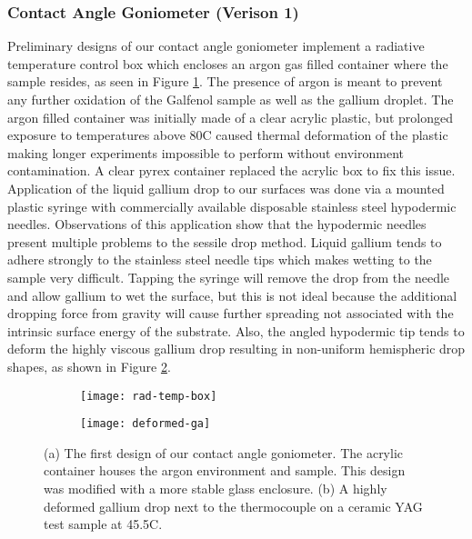 \subsubsection{Contact Angle Goniometer (Verison 1)}
Preliminary designs of our contact angle goniometer implement a radiative temperature control box which encloses an argon gas filled container where the sample resides, as seen in Figure \ref{fig:rad-temp-box}.  The presence of argon is meant to prevent any further oxidation of the Galfenol sample as well as the gallium droplet. The argon filled container was initially made of a clear acrylic plastic, but prolonged exposure to temperatures above 80\degree C caused thermal deformation of the plastic making longer experiments impossible to perform without environment contamination.  A clear pyrex container replaced the acrylic box to fix this issue.  Application of the liquid gallium drop to our surfaces was done via a mounted plastic syringe with commercially available disposable stainless steel hypodermic needles.  Observations of this application show that the hypodermic needles present multiple problems to the sessile drop method.  Liquid gallium tends to adhere strongly to the stainless steel needle tips which makes wetting to the sample very difficult.  Tapping the syringe will remove the drop from the needle and allow gallium to wet the surface, but this is not ideal because the additional dropping force from gravity will cause further spreading not associated with the intrinsic surface energy of the substrate.  Also, the angled hypodermic tip tends to deform the highly viscous gallium drop resulting in non-uniform hemispheric drop shapes, as shown in Figure \ref{fig:deformed-ga}.
\begin{figure}
	\centering
	\begin{subfigure}[c]{0.45\textwidth}
		\texttt{[image: rad-temp-box]}
		\subcaption{~}
		\label{fig:rad-temp-box}		
	\end{subfigure}
	\begin{subfigure}[c]{0.45\textwidth} 
		\texttt{[image: deformed-ga]}
		\subcaption{~}
		\label{fig:deformed-ga}		
	\end{subfigure}
	\caption{(a) The first design of our contact angle goniometer.  The acrylic container houses the argon environment and sample.  This design was modified with a more stable glass enclosure. (b) A highly deformed gallium drop next to the thermocouple on a ceramic YAG test sample at 45.5\degree C.}
	\label{fig:prelim-design}
\end{figure}

